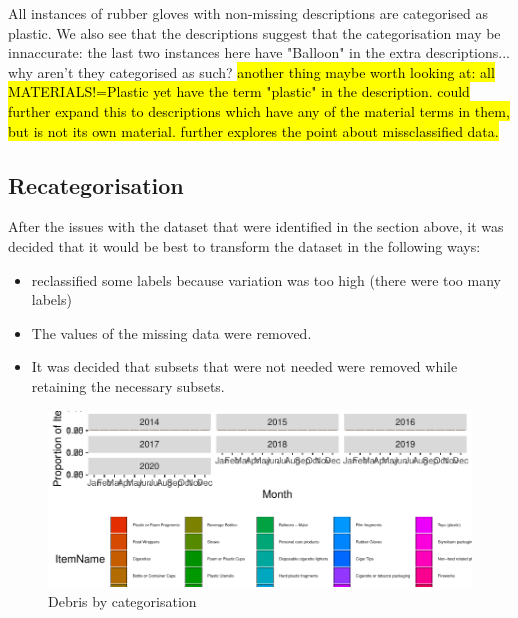\documentclass[10pt]{article}\usepackage[]{graphicx}\usepackage[]{color}
\newenvironment{knitrout}{}{} %
\begin{document}
All instances of rubber gloves with non-missing descriptions are categorised as plastic. We also see that the descriptions suggest that the categorisation may be innaccurate: the last two instances here have "Balloon" in the extra descriptions... why aren't they categorised as such?
\hl{another thing maybe worth looking at: all MATERIALS!=Plastic yet have the term "plastic" in the description. could further expand this to descriptions which have any of the material terms in them, but is not its own material. further explores the point about missclassified data.}





\subsection{Recategorisation}


After the issues with the dataset that were identified in the section above, it was decided that it would be best to transform the dataset in the following ways:
\begin{itemize}
\item reclassified some labels because variation was too high (there were too many labels)
\item The values of the missing data were removed.
\item It was decided that subsets that were not needed were removed while retaining the necessary subsets.
\end{itemize}

\begin{figure}[H] %
\begin{center}
\begin{knitrout}\small
{}\color{fgcolor}
\includegraphics[width=1\linewidth]{figure/unnamed-chunk-8-1} 

\end{knitrout}
\caption {Debris by categorisation}
\label{figE}
\end {center}
\end {figure}
\end{document}
